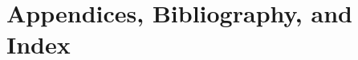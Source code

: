 \documentclass[letterpaper,10pt,titlepage]{custbook}
\begin{document}
%

%

%

%

%


%

%


%


%

\part{Appendices, Bibliography, and Index}

\appendix

%
%
%
%
%
%
\cleardoublepage
{}
\printindex
%
\end{document}
